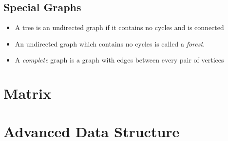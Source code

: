 \subsection{Special Graphs}
\begin{itemize}
	\item A tree is an undirected graph if it contains no cycles and is connected
	\item An undirected graph which contains no cycles is called a \textit{forest}.
	\item A \textit{complete} graph is a graph with edges between every pair of vertices
\end{itemize}

\section{Matrix}

\section{Advanced Data Structure}